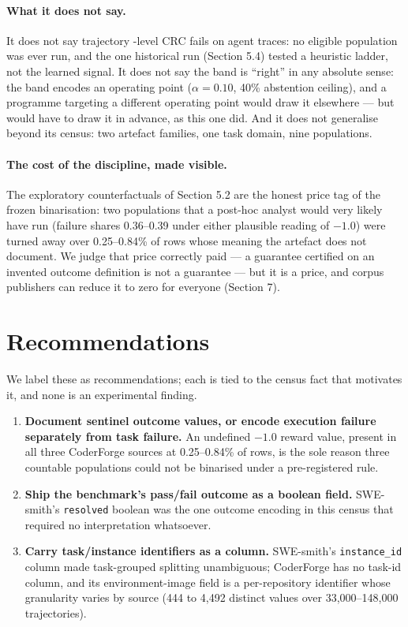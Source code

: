 \documentclass[11pt]{article}
\begin{document}
\paragraph{What it does not say.} It does not say trajectory
-level CRC fails on agent traces: no eligible population was
ever run, and the one historical run (Section 5.4) tested a
heuristic ladder, not the learned signal. It does not say the
band is ``right'' in any absolute sense: the band encodes an
operating point ($\alpha = 0.10$, 40\% abstention ceiling), and
a programme targeting a different operating point would draw
it elsewhere --- but would have to draw it in advance, as this
one did. And it does not generalise beyond its census: two
artefact families, one task domain, nine populations.

\paragraph{The cost of the discipline, made visible.} The
exploratory counterfactuals of Section 5.2 are the honest
price tag of the frozen binarisation: two populations that a
post-hoc analyst would very likely have run (failure shares
0.36--0.39 under either plausible reading of $-1.0$) were
turned away over 0.25--0.84\% of rows whose meaning the
artefact does not document. We judge that price correctly
paid --- a guarantee certified on an invented outcome
definition is not a guarantee --- but it is a price, and
corpus publishers can reduce it to zero for everyone
(Section 7).

\section{Recommendations}

We label these as recommendations; each is tied to the census
fact that motivates it, and none is an experimental finding.

\begin{enumerate}
\item \textbf{Document sentinel outcome values, or encode
execution failure separately from task failure.} An undefined
$-1.0$ reward value, present in all three CoderForge sources
at 0.25--0.84\% of rows, is the sole reason three countable
populations could not be binarised under a pre-registered
rule.
\item \textbf{Ship the benchmark's pass/fail outcome as a
boolean field.} SWE-smith's \texttt{resolved} boolean was the
one outcome encoding in this census that required no
interpretation whatsoever.
\item \textbf{Carry task/instance identifiers as a column.}
SWE-smith's \texttt{instance\_id} column made task-grouped
splitting unambiguous; CoderForge has no task-id column, and
its environment-image field is a per-repository identifier
whose granularity varies by source (444 to 4{,}492 distinct
values over 33{,}000--148{,}000 trajectories).
\end{enumerate}
\end{document}
